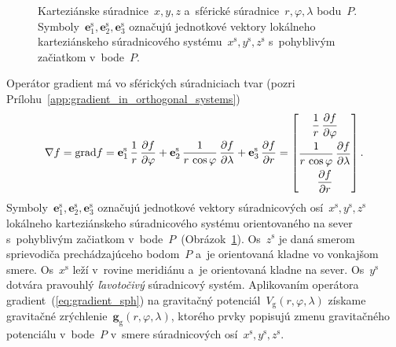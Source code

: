 \documentclass[a4paper, 12pt]{book}
\newcommand{\grad}{\mathrm{grad}}
\newcommand{\gidx}{\mathrm g}
\let\vec\mathbf
\begin{document}
\begin{figure}
\centering

\caption{Karteziánske súradnice~$x, y, z$ a~sférické súradnice~$r, \varphi, 
\lambda$ bodu~$P$.  Symboly~$\vec{e}_1^\mathrm{s}, \vec{e}_2^\mathrm{s}, 
\vec{e}_3^\mathrm{s}$ označujú jednotkové vektory lokálneho karteziánskeho 
súradnicového systému~$x^\mathrm{s}, y^\mathrm{s}, z^\mathrm{s}$ s~pohyblivým 
začiatkom v~bode~$P$.}
\label{fig:cart_sph}
\end{figure}

Operátor gradient má vo sférických súradniciach tvar (pozri 
Prílohu~\ref{app:gradient_in_orthogonal_systems})
%
\begin{equation}
\label{eq:gradient_sph}
\nabla f = \grad f = \vec e_1^\mathrm{s} \, \frac{1}{r} \, \frac{\partial 
f}{\partial \varphi} + \vec e_2^\mathrm{s} \, \frac{1}{r \, \cos\varphi} \, 
\frac{\partial f}{\partial \lambda} + \vec e_3^\mathrm{s} \, \frac{\partial 
f}{\partial r}\\
%
=
%
\begin{bmatrix}
\dfrac{1}{r} \, \dfrac{\partial f}{\partial \varphi} \\[2ex]
\dfrac{1}{r \, \cos\varphi} \, \dfrac{\partial f}{\partial \lambda}\\[2ex]
\dfrac{\partial f}{\partial r}
\end{bmatrix}
{.}
\end{equation}
%
Symboly~$\vec{e}_1^\mathrm{s}, \vec{e}_2^{\mathrm{s}}, \vec{e}_3^\mathrm{s}$ 
označujú jednotkové vektory súradnicových osí~$x^\mathrm{s}, y^\mathrm{s}, 
z^\mathrm{s}$ lokálneho karteziánskeho súradnicového systému orientovaného na 
sever s~pohyblivým začiatkom v~bode~$P$~(Obrázok~\ref{fig:cart_sph}).  
Os~$z^\mathrm{s}$ je daná smerom sprievodiča prechádzajúceho bodom~$P$ a~je 
orientovaná kladne vo vonkajšom smere.  Os~$x^\mathrm{s}$ leží v~rovine 
meridiánu a~je orientovaná kladne na sever.  Os~$y^\mathrm{s}$ dotvára 
pravouhlý \emph{ľavotočivý} súradnicový systém.  Aplikovaním operátora 
gradient~(\ref{eq:gradient_sph}) na gravitačný potenciál~$V_\gidx(r, \varphi, 
\lambda)$ získame gravitačné zrýchlenie~$\vec g_\gidx(r, \varphi, \lambda)$, 
ktorého prvky popisujú zmenu gravitačného potenciálu v~bode~$P$ v~smere 
súradnicových osí~$x^\mathrm{s}, y^\mathrm{s}, z^\mathrm{s}$.
\end{document}
